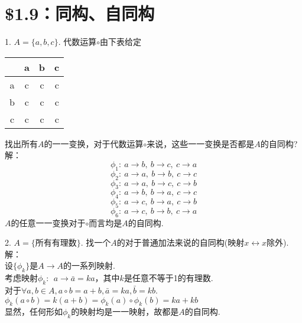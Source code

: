 \documentclass{ctexart}
\begin{document}
\section*{\$1.9：同构、自同构}
1. $A=\{a, b, c\}$. 代数运算$\circ$由下表给定 \\
\begin{center}
	\begin{tabular}{c|ccc}
		& a & b & c \\
		\hline
		a & c & c & c \\
		b & c & c & c \\
		c & c & c & c \\
	\end{tabular} 
\end{center}
找出所有$A$的一一变换，对于代数运算$\circ$来说，这些一一变换是否都是$A$的自同构?\\
解：\\
\begin{equation*}
	\phi_1: \ a \rightarrow b, \ b \rightarrow c, \ c \rightarrow a
\end{equation*}
\begin{equation*}
	\phi_2: \ a \rightarrow a, \ b \rightarrow b, \ c \rightarrow c
\end{equation*}
\begin{equation*}
	\phi_3: \ a \rightarrow a, \ b \rightarrow c, \ c \rightarrow b
\end{equation*}
\begin{equation*}
	\phi_4: \ a \rightarrow b, \ b \rightarrow a, \ c \rightarrow c
\end{equation*}
\begin{equation*}
	\phi_5: \ a \rightarrow c, \ b \rightarrow a, \ c \rightarrow b
\end{equation*}
\begin{equation*}
	\phi_6: \ a \rightarrow c, \ b \rightarrow b, \ c \rightarrow a
\end{equation*}
$A$的任意一一变换对于$\circ$而言均是$A$的自同构.

2. $A=\{$所有有理数$\}$. 找一个$A$的对于普通加法来说的自同构(映射$x \leftrightarrow x$除外). \\
解：\\
设$\{ \phi_k \}$是$A \rightarrow A$的一系列映射. \\
考虑映射$\phi_k : \ \  a \rightarrow \bar{a} = ka$，其中$k$是任意不等于1的有理数. \\
对于$\forall a,b \in A, a \circ b = a + b, \bar{a} = ka, \bar{b} = kb.$\\
$\phi_k(a \circ b) = k(a+b) = \phi_k(a) \circ \phi_k(b) = ka+kb$ \\
显然，任何形如$\phi_k$的映射均是一一映射，故都是$A$的自同构.
\end{document}
